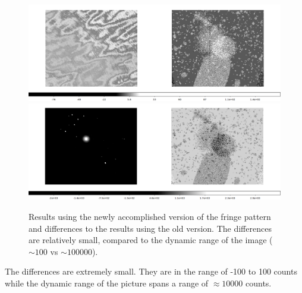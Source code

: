 \documentclass[11pt,a4paper,twoside]{article}
\begin{document}
\begin{figure}
\centering
\includegraphics[width=\linewidth]{./pic/diff_fringe}
\includegraphics[width=\linewidth]{./pic/diff_result}
\caption{Results using the newly accomplished version of the fringe pattern
        and differences to the results using the old version. The differences
        are relatively small, compared to the dynamic range of the image ($\sim
        100$ vs $\sim 100000$).}
\label{fig:df}
\end{figure}

The differences are extremely small. They are in the range of -100 to 100 counts
while the dynamic range of the picture spans a range of $\approx 10000$ counts.
\end{document}
